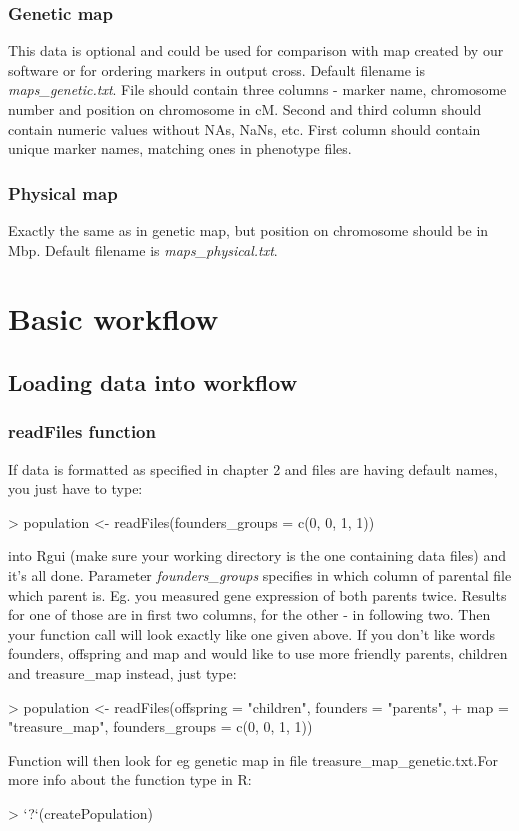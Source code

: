 \documentclass{article}
\begin{document}
\begin{multicols}{2}
\subsubsection{Genetic map}
This data is optional and could be used for comparison with map created by our software or for ordering markers in output cross. Default filename is \emph{maps\_genetic.txt}. File should contain three columns - marker name, chromosome number and position on chromosome in cM. Second and third column should contain numeric values without NAs, NaNs, etc. First column should contain unique marker names, matching ones in phenotype files.
\subsubsection{Physical map}
Exactly the same as in genetic map, but position on chromosome should be in Mbp. Default filename is \emph{maps\_physical.txt}.
\end{multicols}
\newpage

\section{Basic workflow}
\subsection{Loading data into workflow}
\subsubsection{readFiles function}
If data is formatted as specified in chapter 2 and files are having default names, you just have to type: 
\begin{Schunk}
\begin{Sinput}
> population <- readFiles(founders_groups = c(0, 0, 1, 1))
\end{Sinput}
\end{Schunk}
 into Rgui (make sure your working directory is the one containing data files) and it's all done. Parameter \emph{founders\_groups} specifies in which column of parental file which parent is. Eg. you measured gene expression of both parents twice. Results for one of those are in first two columns, for the other - in following two. Then your function call will look exactly like one given above. 
If you don't like words founders, offspring and map and would like to use more friendly parents, children and treasure\_map instead, just type:
\begin{Schunk}
\begin{Sinput}
> population <- readFiles(offspring = "children", founders = "parents", 
+     map = "treasure_map", founders_groups = c(0, 0, 1, 1))
\end{Sinput}
\end{Schunk}
{\noindent}Function will then look for eg genetic map in file treasure\_map\_genetic.txt.For more info about the function type in R:
\begin{Schunk}
\begin{Sinput}
> `?`(createPopulation)
\end{Sinput}
\end{Schunk}
\end{document}
